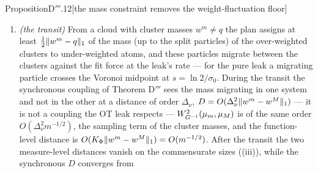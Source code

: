 \begin{thm}{Proposition}{D$'''$.12}[the mass constraint removes the weight-fluctuation floor]
\begin{enumerate}[label=\textup{(\roman*)}]
    particle carrying at least one). At a stationary configuration whose unsplit particles are collapsed by class
    (the minimisers of Proposition D$'''$.5's type) a split particle sits where the fit force balances the pull
    toward its barycentric target $\bar T_i\in\operatorname{conv}\{\vartheta^0_j : \gamma_{ij} > 0\}$ --- a
    \emph{bridge particle} between the clusters --- so the stationary measure differs from $\mu^*(q)$ by at most
    $(K_0 - 1)/m$ of mass at the bridge positions and by the $O(K_0/m)$ shift of the class weights:
    \begin{gather*}
      W^2_{\Ginv}(\mu^*_m,\mu^*(q))\le4(K_0 - 1)R_\Theta^2/m + O(K_0^2\norm{S}^2/m^2),\\
      \norm{\fhat^*_m - \fhat^*(q)}_{L^2(\rho)}\le2(K_0 - 1)K_\Phi/m + O(K_0(K_\Phi + L_\vartheta^G\norm{S})/m),
    \end{gather*}
    $R_\Theta$ the a priori radius of Step~0 (with the hull of $\supp\nu$). The orders are the content, not the
    constants --- on the instance $R_\Theta = 2865$ makes the first bound $4\cdot10^6$ against a measured 1.0--1.4
    at $m = 16$, and the second $1.00$ against $0.018$: the function-level floor is $O(1/m^2)$ in square, one order
    in $m$ below the $(1/m - 1/M)$ law, and the $W^2$ floor is $O(1/m)$ against the nearest-atom leak's
    $O(m^{-1/2})$ of (iii) --- half an order gained in $W^2$, a full order at function level --- with deterministic
    constants set by the plan's split pattern (measured $m\cdot W^2(\mu^*_m,\nu)\approx20 = 0.5\Delta_\nu^2$ and
    $m\cdot\norm{\fhat^*_m - f}/\norm{f}\approx0.55$).
  \item \emph{(the transit)} From a cloud with cluster masses $w^m\ne q$ the plan assigns at least
    $\frac12\lVert w^m - q\rVert_1$ of the mass (up to the split particles) of the over-weighted clusters to under-weighted
    atoms, and these particles migrate between the clusters against the fit force at the leak's rate --- for the
    pure leak a migrating particle crosses the Voronoi midpoint at $s = \ln2/\sigma_0$. During the transit the
    synchronous coupling of Theorem D$'''$ sees the mass migrating in one system and not in the other at a distance
    of order $\Delta_\nu$, $D = O(\Delta_\nu^2\lVert w^m - w^M\rVert_1)$ --- it is not a coupling the OT leak respects ---
    $W^2_{G^{-1}}(\mu_m,\mu_M)$ is of the same order $O(\Delta_\nu^2m^{-1/2})$, the sampling term of the cluster
    masses, and the function-level distance is $O(K_\Phi\lVert w^m - w^M\rVert_1) = O(m^{-1/2})$. After the transit the
    two measure-level distances vanish on the commensurate sizes ((iii)), while the synchronous $D$ converges from

\end{enumerate}
\end{thm}
